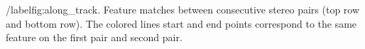/label{fig:along_track}. Feature matches between consecutive stereo pairs (top row and bottom row). The colored lines start and end points correspond to the same feature on the first pair and second pair. 
  
